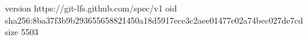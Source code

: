version https://git-lfs.github.com/spec/v1
oid sha256:8ba37f3b9b293655658821450a18d5917ece3c2aee01477e02a74bec027de7cd
size 5503
